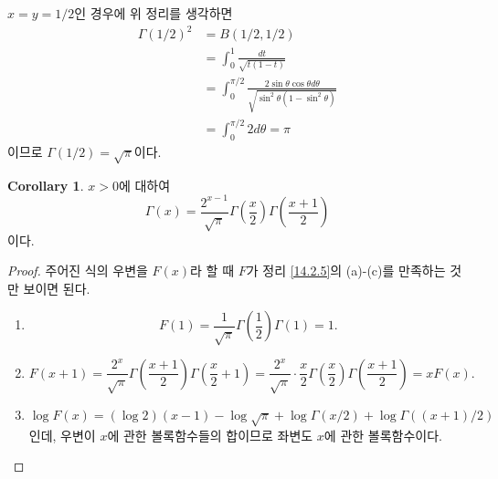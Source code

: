 \documentclass[11pt]{book}
\numberwithin{equation}{chapter}
\newcommand{\paren}[1]{\left(#1\right)}
\theoremstyle{definition}
\newtheorem{cor}[thm]{Corollary}
\newenvironment{enum}
	{\begin{enumerate}[label=(\alph*), leftmargin=2\parindent]}
	{\end{enumerate}}
\begin{document}
\(x = y = 1/2\)인 경우에 위 정리를 생각하면
\begin{align*}
    \Gamma(1/2)^2 &= B(1/2, 1/2)\\
    &= \int_0^1 \frac{dt}{\sqrt{t(1-t)}}\\
    &= \int_0^{\pi/2} \frac{2\sin\theta\cos\theta d\theta}{\sqrt{\sin^2\theta(1-\sin^2\theta)}}\\
    &= \int_0^{\pi/2} 2 d\theta = \pi
\end{align*}
이므로 \(\Gamma(1/2) = \sqrt{\pi}\)이다.

\begin{cor}
    \(x > 0\)에 대하여
    \[
    \Gamma(x) = \frac{2^{x-1}}{\sqrt{\pi}} \Gamma \paren{\frac{x}{2}} \Gamma \paren{\frac{x+1}{2}}    
    \]
    이다.
\end{cor}
\begin{proof}
    주어진 식의 우변을 \(F(x)\)라 할 때 \(F\)가 정리 \ref{14.2.5}의 (a)-(c)를 만족하는 것만 보이면 된다.
    \begin{enum}
        \item
        \[
        F(1) = \frac{1}{\sqrt{\pi}} \Gamma \paren{\frac{1}{2}} \Gamma (1) = 1.  
        \]
        \item
        \[
        F(x+1) = \frac{2^{x}}{\sqrt{\pi}} \Gamma\paren{\frac{x+1}{2}} \Gamma \paren{\frac{x}{2} + 1} = \frac{2^{x}}{\sqrt{\pi}} \cdot \frac{x}{2} \Gamma \paren{\frac{x}{2}} \Gamma \paren{\frac{x+1}{2}} = xF(x). 
        \]
        \item \(\log F(x) = (\log 2)(x-1) - \log \sqrt{\pi} + \log \Gamma (x/2) + \log \Gamma((x+1)/2)\)인데, 우변이 \(x\)에 관한 볼록함수들의 합이므로 좌변도 \(x\)에 관한 볼록함수이다.
    \end{enum}
\end{proof}
\end{document}

